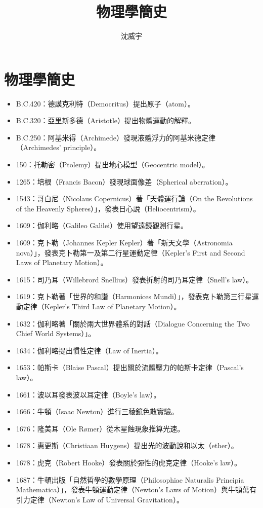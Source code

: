 \documentclass[a4paper,12pt]{article}
\begin{document}
\title{物理學簡史}
\author{沈威宇}
\date{\temtoday}
\titletocdoc
\section{物理學簡史}
\begin{itemize}
\item B.C.420：德謨克利特（Democritus）提出原子（atom）。
\item B.C.320：亞里斯多德（Aristotle）提出物體運動的解釋。
\item B.C.250：阿基米得（Archimede）發現液體浮力的阿基米德定律（Archimedes' principle）。
\item 150：托勒密（Ptolemy）提出地心模型（Geocentric model）。
\item 1265：培根（Francis Bacon）發現球面像差（Spherical aberration）。
\item 1543：哥白尼（Nicolaus Copernicus）著「天體運行論（On the Revolutions of the Heavenly Spheres）」，發表日心說（Heliocentrism）。
\item 1609：伽利略（Galileo Galilei）使用望遠鏡觀測行星。
\item 1609：克卜勒（Johannes Kepler Kepler）著「新天文學（Astronomia nova）」，發表克卜勒第一及第二行星運動定律（Kepler's First and Second Laws of Planetary Motion）。
\item 1615：司乃耳（Willebrord Snellius）發表折射的司乃耳定律（Snell's law）。
\item 1619：克卜勒著「世界的和諧（Harmonices Mundi）」，發表克卜勒第三行星運動定律（Kepler's Third Law of Planetary Motion）。
\item 1632：伽利略著「關於兩大世界體系的對話（Dialogue Concerning the Two Chief World Systems）」。
\item 1634：伽利略提出慣性定律（Law of Inertia）。
\item 1653：帕斯卡（Blaise Pascal）提出關於流體壓力的帕斯卡定律（Pascal's law）。
\item 1661：波以耳發表波以耳定律（Boyle's law）。
\item 1666：牛頓（Isaac Newton）進行三稜鏡色散實驗。
\item 1676：隆美耳（Ole Rømer）從木星蝕現象推算光速。
\item 1678：惠更斯（Christiaan Huygens）提出光的波動說和以太（ether）。
\item 1678：虎克（Robert Hooke）發表關於彈性的虎克定律（Hooke's law）。
\item 1687：牛頓出版「自然哲學的數學原理（Philosophiae Naturalis Principia Mathematica）」，發表牛頓運動定律（Newton's Laws of Motion）與牛頓萬有引力定律（Newton's Law of Universal Gravitation）。

\end{itemize}
\end{document}
